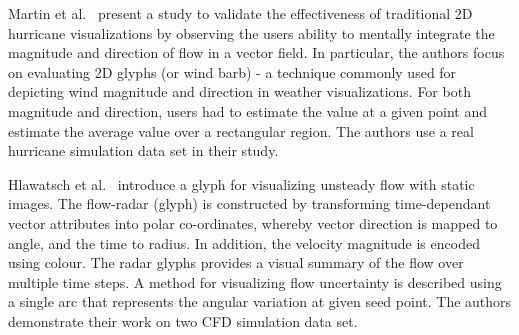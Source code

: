 
Martin et al.~\cite{martin08hurricaneUserStudy} present a study to validate the effectiveness of traditional 2D hurricane visualizations by observing the users ability to mentally integrate the magnitude and direction of flow in a vector field. In particular, the authors focus on evaluating 2D glyphs (or wind barb) - a technique commonly used for depicting wind magnitude and direction in weather visualizations. For both magnitude and direction, users had to estimate the value at a given point and estimate the average value over a rectangular region. The authors use a real hurricane simulation data set in their study.

Hlawatsch et al.~\cite{hlawatsch11flowRadar} introduce a glyph for visualizing unsteady flow with static images. The flow-radar (glyph) is constructed by transforming time-dependant vector attributes into polar co-ordinates, whereby vector direction is mapped to angle, and the time to radius. In addition, the velocity magnitude is encoded using colour. The radar glyphs provides a visual summary of the flow over multiple time steps. A method for visualizing flow uncertainty is described using a single arc that represents the angular variation at given seed point. The authors demonstrate their work on two CFD simulation data set.

